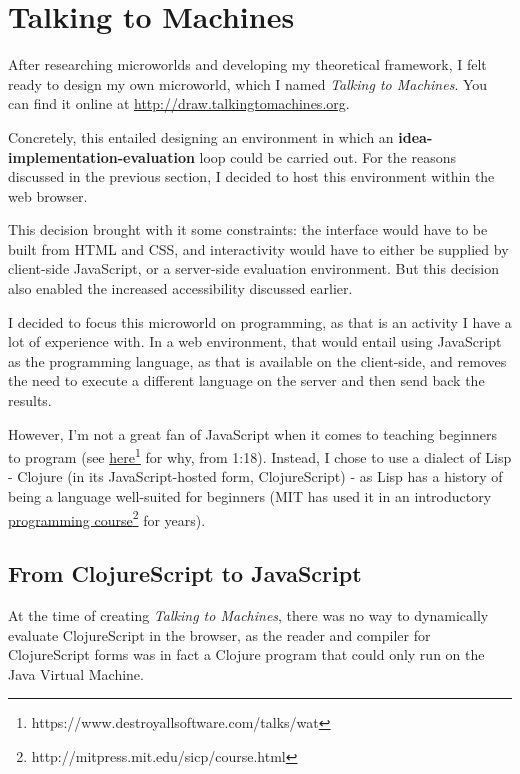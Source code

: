 \section{Talking to Machines}

After researching microworlds and developing my theoretical framework, I
felt ready to design my own microworld, which I named \emph{Talking to
Machines}. You can find it online at \url{http://draw.talkingtomachines.org}.

Concretely, this entailed designing an environment in which an
\textbf{idea-implementation-evaluation} loop could be carried out. For the
reasons discussed in the previous section, I decided to host this
environment within the web browser.

This decision brought with it some constraints: the interface would have
to be built from HTML and CSS, and interactivity would have to either be
supplied by client-side JavaScript, or a server-side evaluation
environment. But this decision also enabled the increased accessibility
discussed earlier.

I decided to focus this microworld on programming, as that is an
activity I have a lot of experience with. In a web environment, that
would entail using JavaScript as the programming language, as that is
available on the client-side, and removes the need to execute a
different language on the server and then send back the results.

However, I'm not a great fan of JavaScript when it comes to teaching
beginners to program (see \href{https://www.destroyallsoftware.com/talks/wat}{here}\footnote{https://www.destroyallsoftware.com/talks/wat} for why, from 1:18). Instead, I chose to use
a dialect of Lisp - Clojure (in its JavaScript-hosted form,
ClojureScript) - as Lisp has a history of being a language well-suited
for beginners (MIT has used it in an introductory \href{http://mitpress.mit.edu/sicp/course.html}{programming course}\footnote{http://mitpress.mit.edu/sicp/course.html} for years).

\subsection{From ClojureScript to JavaScript}

At the time of creating \emph{Talking to Machines}, there was no way to
dynamically evaluate ClojureScript in the browser, as the reader and
compiler for ClojureScript forms was in fact a Clojure program that
could only run on the Java Virtual Machine.

